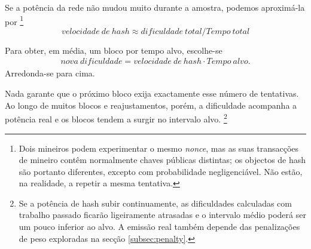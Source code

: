Se a potência da rede não mudou muito durante a amostra, podemos aproximá-la
por
\footnote{Dois mineiros podem experimentar o mesmo {\em nonce}, mas as suas
transacções de mineiro contêm normalmente chaves públicas distintas; os
objectos de hash são portanto diferentes, excepto com probabilidade
negligenciável. Não estão, na realidade, a repetir a mesma tentativa.}
\vspace{.175cm}           
\[\mathit{velocidade\ de\ hash} \approx \mathit{dificuldade\ total}/\mathit{Tempo\ total}\]



Para obter, em média, um bloco por tempo alvo, escolhe-se
\begin{align*}
\mathit{nova\ dificuldade} =
\mathit{velocidade\ de\ hash}\cdot\mathit{Tempo\ alvo}.
\end{align*}
Arredonda-se para cima.



Nada garante que o próximo bloco exija exactamente esse número de tentativas.
Ao longo de muitos blocos e reajustamentos, porém, a dificuldade acompanha a
potência real e os blocos tendem a surgir no intervalo alvo.
\footnote{Se a potência de hash subir continuamente, as dificuldades calculadas
com trabalho passado ficarão ligeiramente atrasadas e o intervalo médio poderá
ser um pouco inferior ao alvo. A emissão real também depende das penalizações
de peso exploradas na secção \ref{subsec:penalty}.}

